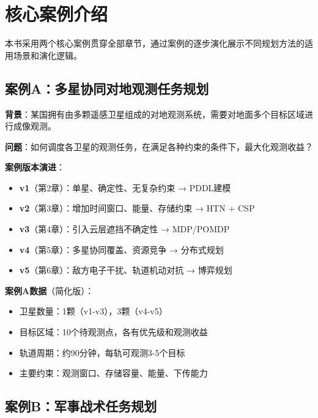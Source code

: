\section{核心案例介绍}

本书采用两个核心案例贯穿全部章节，通过案例的逐步演化展示不同规划方法的适用场景和演化逻辑。

\subsection{案例A：多星协同对地观测任务规划}

\begin{caseboxA}
\textbf{背景}：某国拥有由多颗遥感卫星组成的对地观测系统，需要对地面多个目标区域进行成像观测。

\textbf{问题}：如何调度各卫星的观测任务，在满足各种约束的条件下，最大化观测收益？

\textbf{案例版本演进}：
\begin{itemize}
  \item \textbf{v1}（第2章）：单星、确定性、无复杂约束 → PDDL建模
  \item \textbf{v2}（第3章）：增加时间窗口、能量、存储约束 → HTN + CSP
  \item \textbf{v3}（第4章）：引入云层遮挡不确定性 → MDP/POMDP
  \item \textbf{v4}（第5章）：多星协同覆盖、资源竞争 → 分布式规划
  \item \textbf{v5}（第6章）：敌方电子干扰、轨道机动对抗 → 博弈规划
\end{itemize}
\end{caseboxA}

\textbf{案例A数据}（简化版）：
\begin{itemize}[leftmargin=2em]
  \item 卫星数量：1颗（v1-v3），3颗（v4-v5）
  \item 目标区域：10个待观测点，各有优先级和观测收益
  \item 轨道周期：约90分钟，每轨可观测3-5个目标
  \item 主要约束：观测窗口、存储容量、能量、下传能力
\end{itemize}

\subsection{案例B：军事战术任务规划}

